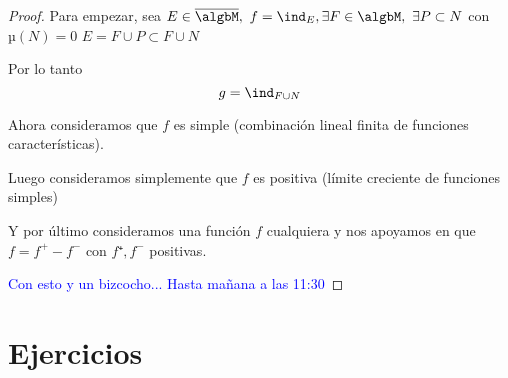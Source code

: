 \documentclass{apuntes}
\begin{document}
\begin{enumerate}
\begin{proof}
Para empezar, sea $E \in \overline{\algbM}, \ f= \ind_E, \exists F \in \algbM, \ \exists P \subset N$ con $µ(N)=0$ $E=F\cup P \subset F \cup N$

Por lo tanto
\[g = \ind_{F \cup N}\]

Ahora consideramos que $f$ es simple (combinación lineal finita de funciones características).

Luego consideramos simplemente que $f$ es positiva (límite creciente de funciones simples)

Y por último consideramos una función $f$ cualquiera y nos apoyamos en que $f= f^+-f^-$ con $f⁺, f^-$ positivas.

\textcolor{blue}{Con esto y un bizcocho... Hasta mañana a las 11:30}
\end{proof}
\end{enumerate}



\appendix
\chapter{Ejercicios}




\printindex
\end{document}

